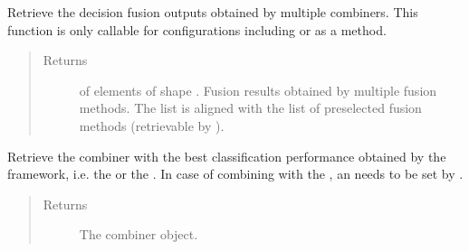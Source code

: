 \documentclass[letterpaper,10pt,english]{sphinxmanual}
\begin{document}
\begin{fulllineitems}
\begin{fulllineitems}
\begin{quote}
\begin{description}
\end{description}\end{quote}

\end{fulllineitems}


\begin{fulllineitems}
\label{\detokenize{pusion.control.decision_processor:pusion.control.decision_processor.DecisionProcessor.get_multi_combiner_decision_output}}
\sphinxAtStartPar
Retrieve the decision fusion outputs obtained by multiple combiners. This function is only callable for
configurations including  or  as a method.
\begin{quote}\begin{description}
\item[{Returns}] \leavevmode
\sphinxAtStartPar
{} of  elements of shape .
Fusion results obtained by multiple fusion methods.
The list is aligned with the list of preselected fusion methods (retrievable by ).

\end{description}\end{quote}

\end{fulllineitems}


\begin{fulllineitems}
\label{\detokenize{pusion.control.decision_processor:pusion.control.decision_processor.DecisionProcessor.get_optimal_combiner}}
\sphinxAtStartPar
Retrieve the combiner with the best classification performance obtained by the framework, i.e. the
 or the .
In case of combining with the , an  needs to be set by .
\begin{quote}\begin{description}
\item[{Returns}] \leavevmode
\sphinxAtStartPar
The combiner object.


\end{description}
\end{quote}
\end{fulllineitems}
\end{fulllineitems}
\end{document}
